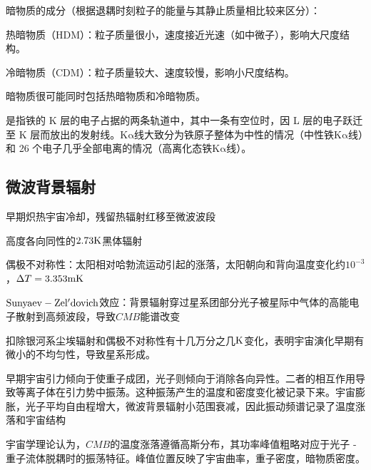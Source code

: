 \documentclass[../天体物理基础.tex]{subfiles}
\begin{document}
暗物质的成分（根据退耦时刻粒子的能量与其静止质量相比较来区分）：

热暗物质（HDM）：粒子质量很小，速度接近光速（如中微子），影响大尺度结构。

冷暗物质（CDM）：粒子质量较大、速度较慢，影响小尺度结构。

暗物质很可能同时包括热暗物质和冷暗物质。

是指铁的 K 层的电子占据的两条轨道中，其中一条有空位时，因 L 层的电子跃迁至 K 层而放出的发射线。$\mathrm{K\alpha}$线大致分为铁原子整体为中性的情况（中性铁$\mathrm{K\alpha}$线）和 26 个电子几乎全部电离的情况（高离化态铁$\mathrm{K\alpha}$线）。


\subsection{微波背景辐射}
早期炽热宇宙冷却，残留热辐射红移至微波波段

高度各向同性的$2.73\rm K$黑体辐射

偶极不对称性：太阳相对哈勃流运动引起的涨落，太阳朝向和背向温度变化约$10^{-3}$，$\Delta T=3.353\rm mK$

$\rm Sunyaev-Zel'dovich$效应：背景辐射穿过星系团部分光子被星际中气体的高能电子散射到高频波段，导致$CMB$能谱改变

扣除银河系尘埃辐射和偶极不对称性有十几万分之几$\rm K$变化，表明宇宙演化早期有微小的不均匀性，导致星系形成。

早期宇宙引力倾向于使重子成团，光子则倾向于消除各向异性。二者的相互作用导致等离子体在引力势中振荡。这种振荡产生的温度和密度变化被记录下来。宇宙膨胀，光子平均自由程增大，微波背景辐射小范围衰减，因此振动频谱记录了温度涨落和宇宙结构

宇宙学理论认为，$CMB$的温度涨落遵循高斯分布，其功率峰值粗略对应于光子 - 重子流体脱耦时的振荡特征。峰值位置反映了宇宙曲率，重子密度，暗物质密度。

\printbibliography
\end{document}
